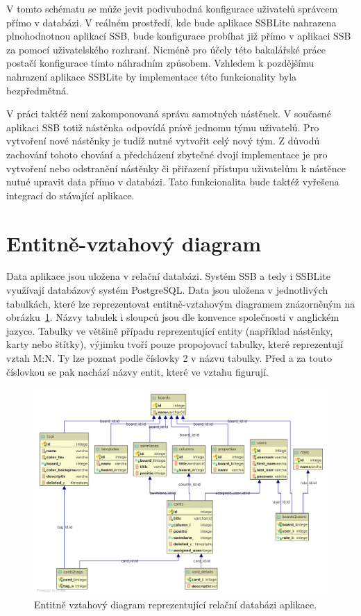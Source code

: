 V tomto schématu se může jevit podivuhodná konfigurace uživatelů správcem přímo v databázi. V reálném prostředí, kde bude aplikace SSBLite nahrazena plnohodnotnou aplikací SSB, bude konfigurace probíhat již přímo v aplikaci SSB za pomocí uživatelského rozhraní. Nicméně pro účely této bakalářské práce postačí konfigurace tímto náhradním způsobem. Vzhledem k pozdějšímu nahrazení aplikace SSBLite by implementace této funkcionality byla bezpředmětná.

V práci taktéž není zakomponovaná správa samotných nástěnek. V současné aplikaci SSB totiž nástěnka odpovídá právě jednomu týmu uživatelů. Pro vytvoření nové nástěnky je tudíž nutné vytvořit celý nový tým. Z důvodů zachování tohoto chování a předcházení zbytečné dvojí implementace je pro vytvoření nebo odstranění nástěnky či přiřazení přístupu uživatelům k nástěnce nutné upravit data přímo v databázi. Tato funkcionalita bude taktéž vyřešena integrací do stávající aplikace.

\section{Entitně-vztahový diagram}\label{sec:erd}
Data aplikace jsou uložena v relační databázi. Systém SSB a tedy i SSBLite využívají databázový systém PostgreSQL. Data jsou uložena v jednotlivých tabulkách, které lze reprezentovat entitně-vztahovým diagramem znázorněným na obrázku~\ref{img:erd}. Názvy tabulek i sloupců jsou dle konvence společnosti v anglickém jazyce. Tabulky ve většině případu reprezentující entity (například nástěnky, karty nebo štítky), výjimku tvoří pouze propojovací tabulky, které reprezentují vztah M:N. Ty lze poznat podle číslovky 2 v názvu tabulky. Před a za touto číslovkou se pak nachází názvy entit, které ve vztahu figurují.

\begin{figure}[H]
	\centering
	\label{img:erd}
	\includegraphics[width=\textwidth]{obrazky-figures/erd.pdf}
	\caption{Entitně vztahový diagram reprezentující relační databázi aplikace.}
\end{figure}


